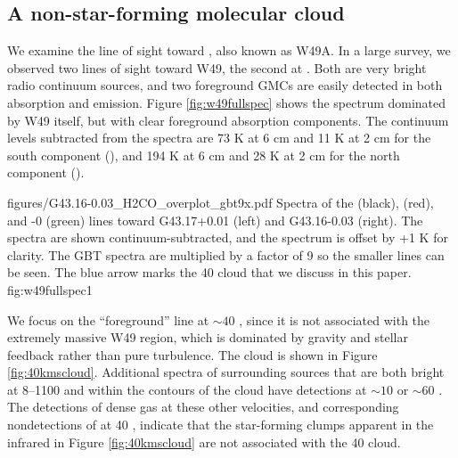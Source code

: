 \subsection{\GRSMC A non-star-forming molecular cloud}



We examine the line of sight toward \north, also known as W49A.  In a large
survey, we observed two lines of sight toward W49, the second at \south.  Both
are very bright radio continuum sources, and two foreground GMCs are easily
detected in both \formaldehyde absorption and \thirteenco emission.  Figure
\ref{fig:w49fullspec} shows the spectrum dominated by W49 itself, but with
clear \formaldehyde foreground absorption components.  The continuum levels
subtracted from the spectra are 73 K at 6 cm and 11 K at 2 cm for the south
component (\south), and 194 K at 6 cm and 28 K at 2 cm for the north component
(\north).


          {figures/G43.16-0.03_H2CO_overplot_gbt9x.pdf}
{Spectra of the \formaldehyde \oneone (black), \twotwo (red), and -0 (green) lines toward G43.17+0.01 (left) and G43.16-0.03 (right).
The \formaldehyde spectra are shown continuum-subtracted, and the \thirteenco
spectrum is offset by +1 K for clarity.  The GBT \twotwo spectra are multiplied
by a factor of 9 so the smaller lines can be seen.  The blue arrow marks the 40 \kms
cloud \GRSMC that we discuss in this paper. %
}{fig:w49fullspec}{1}

We focus on the ``foreground'' line at $\sim40$ \kms, since it is not
associated with the extremely massive W49 region, which is dominated by gravity
and stellar feedback rather than pure turbulence.  The cloud is shown in Figure
\ref{fig:40kmscloud}.  
Additional \formaldehyde spectra of surrounding sources that are both bright at
8--1100 \um and within the \thirteenco contours of the cloud have \formaldehyde
\twotwo detections at $\sim 10$ or $\sim 60$ \kms. The detections of dense gas
at these other velocities, and corresponding nondetections of \twotwo at 40
\kms, indicate that the star-forming clumps apparent in the infrared in Figure
\ref{fig:40kmscloud} are not associated with the 40 \kms cloud.  

